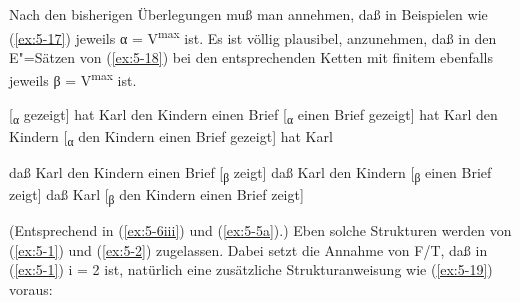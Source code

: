 \documentclass[output=paper]{LSP/langsci}
\begin{document}
\ssubsection{}%
\label{subsec:5-2-2}
Nach den bisherigen Überlegungen muß man annehmen, daß in Beispielen wie (\ref{ex:5-17}) jeweils α = V\textsuperscript{max} ist. Es ist völlig plausibel, anzunehmen, daß in den E"=Sätzen von (\ref{ex:5-18}) bei den entsprechenden Ketten mit finitem  ebenfalls jeweils β = V\textsuperscript{max} ist.

\begin{exe}
\ex%
\label{ex:5-17}
\begin{xlist}
\ex%
\label{ex:5-17a}
[\textsubscript{α} gezeigt] hat Karl den Kindern einen Brief
\ex%
\label{ex:5-17b}
 [\textsubscript{α} einen Brief gezeigt] hat Karl den Kindern
\ex%
\label{ex:5-17c}
[\textsubscript{α} den Kindern einen Brief gezeigt] hat Karl
\end{xlist}
\ex%
\label{ex:5-18}
\begin{xlist}
\ex%
\label{ex:5-18a}
daß Karl den Kindern einen Brief [\textsubscript{β} zeigt]
\ex%
\label{ex:5-18b}
daß Karl den Kindern [\textsubscript{β} einen Brief zeigt]
\ex%
\label{ex:5-18c}
daß Karl [\textsubscript{β} den Kindern einen Brief zeigt]
\end{xlist}
\end{exe}
(Entsprechend \zb in (\ref{ex:5-6iii}) und (\ref{ex:5-5a}).) Eben solche Strukturen werden von (\ref{ex:5-1}) und (\ref{ex:5-2}) zugelassen. Dabei setzt die Annahme von F/T, daß in (\ref{ex:5-1}) i = 2 ist, natürlich eine zusätzliche Strukturanweisung wie (\ref{ex:5-19}) voraus:
\end{document}
